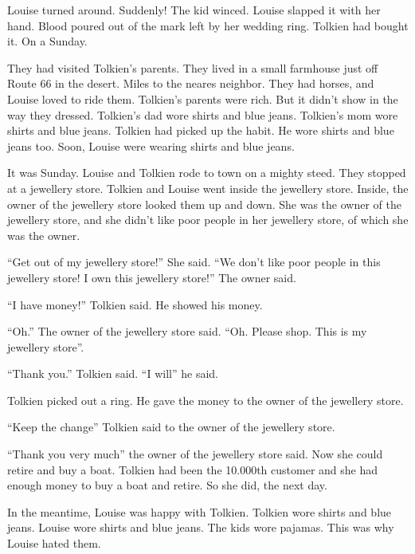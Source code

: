Louise turned around. Suddenly! The kid winced. Louise slapped it
with her hand. Blood poured out of the mark left by her wedding
ring. Tolkien had bought it. On a Sunday.



They had visited Tolkien's parents. They lived in a small farmhouse
just off Route 66 in the desert. Miles to the neares neighbor. They
had horses, and Louise loved to ride them. Tolkien's parents were
rich. But it didn't show in the way they dressed. Tolkien's dad
wore shirts and blue jeans. Tolkien's mom wore shirts and blue
jeans. Tolkien had picked up the habit. He wore shirts and blue
jeans too. Soon, Louise were wearing shirts and blue jeans.



It was Sunday. Louise and Tolkien rode to town on a mighty steed.
They stopped at a jewellery store. Tolkien and Louise went inside
the jewellery store. Inside, the owner of the jewellery store
looked them up and down. She was the owner of the jewellery store,
and she didn't like poor people in her jewellery store, of which
she was the owner.



``Get out of my jewellery store!'' She said. ``We don't like poor
people in this jewellery store! I own this jewellery store!'' The
owner said.



``I have money!'' Tolkien said. He showed his money.



``Oh.'' The owner of the jewellery store said. ``Oh. Please shop. This
is my jewellery store''.



``Thank you.'' Tolkien said. ``I will'' he said.



Tolkien picked out a ring. He gave the money to the owner of the
jewellery store.



``Keep the change'' Tolkien said to the owner of the jewellery
store.



``Thank you very much'' the owner of the jewellery store said. Now
she could retire and buy a boat. Tolkien had been the 10.000th
customer and she had enough money to buy a boat and retire. So she
did, the next day.



In the meantime, Louise was happy with Tolkien. Tolkien wore shirts
and blue jeans. Louise wore shirts and blue jeans. The kids wore
pajamas. This was why Louise hated them.



